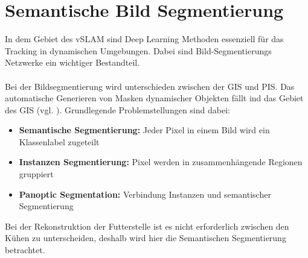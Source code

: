 \documentclass[12pt,DIV=15,BCOR=15mm,twoside,headsepline,abstract=true,listof=totoc,bibliography=totoc]{scrreprt}
\theoremstyle{remark}    %
\begin{document}
    \chapter{Semantische Bild Segmentierung}\label{sec:SemSeg}

    In dem Gebiet des \ac{vSLAM} sind Deep Learning Methoden essenziell für das Tracking in dynamischen Umgebungen. Dabei sind Bild-Segmentierungs Netzwerke ein 
    wichtiger Bestandteil.\\\\
    Bei der Bildsegmentierung wird unterschieden zwischen der \ac{GIS} und \ac{PIS}. Das automatische Generieren von Masken dynamischer Objekten fällt ind das 
    Gebiet des \ac{GIS} (vgl. \cite{zhou2024imagesegmentationfoundationmodel}). 
    Grundlegende Problemstellungen sind dabei:
    \begin{itemize}
        \item \textbf{Semantische Segmentierung:} Jeder Pixel in einem Bild wird ein Klassenlabel zugeteilt
        \item \textbf{Instanzen Segmentierung:} Pixel werden in zusammenhängende Regionen gruppiert
        \item \textbf{Panoptic Segmentation:} Verbindung Instanzen und semantischer Segmentierung
    \end{itemize}
    Bei der Rekonstruktion der Futterstelle ist es nicht erforderlich zwischen den Kühen zu unterscheiden, deshalb wird hier die Semantischen 
    Segmentierung betrachtet.
\end{document}
